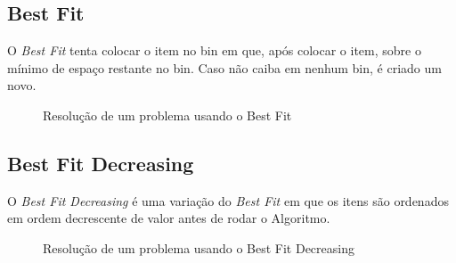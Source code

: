\subsection{Best Fit}

O \textit{Best Fit} tenta colocar o item no bin em que, após colocar o item, sobre o mínimo de espaço restante
no bin. Caso não caiba em nenhum bin, é criado um novo.

\begin{figure}[H]
  \centering
  \caption{Resolução de um problema usando o Best Fit}
\end{figure}

\subsection{Best Fit Decreasing}

O \textit{Best Fit Decreasing} é uma variação do \textit{Best Fit} em que os itens são ordenados em ordem
decrescente de valor antes de rodar o Algoritmo.

\begin{figure}[H]
  \centering
  \caption{Resolução de um problema usando o Best Fit Decreasing}
\end{figure}

